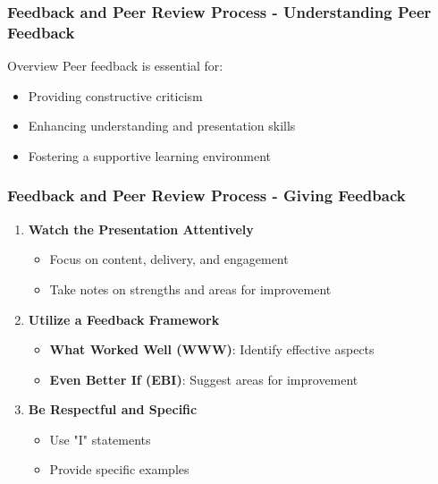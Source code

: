 \documentclass[aspectratio=169]{beamer}
\begin{document}
\begin{frame}[fragile]
    \frametitle{Feedback and Peer Review Process - Understanding Peer Feedback}
    \begin{block}{Overview}
        Peer feedback is essential for:
        \begin{itemize}
            \item Providing constructive criticism
            \item Enhancing understanding and presentation skills
            \item Fostering a supportive learning environment
        \end{itemize}
    \end{block}
\end{frame}

\begin{frame}[fragile]
    \frametitle{Feedback and Peer Review Process - Giving Feedback}
    \begin{enumerate}
        \item \textbf{Watch the Presentation Attentively}
            \begin{itemize}
                \item Focus on content, delivery, and engagement
                \item Take notes on strengths and areas for improvement
            \end{itemize}
        \item \textbf{Utilize a Feedback Framework}
            \begin{itemize}
                \item \textbf{What Worked Well (WWW)}: Identify effective aspects
                \item \textbf{Even Better If (EBI)}: Suggest areas for improvement
            \end{itemize}
        \item \textbf{Be Respectful and Specific}
            \begin{itemize}
                \item Use "I" statements
                \item Provide specific examples
            \end{itemize}
    \end{enumerate}
\end{frame}
\end{document}
